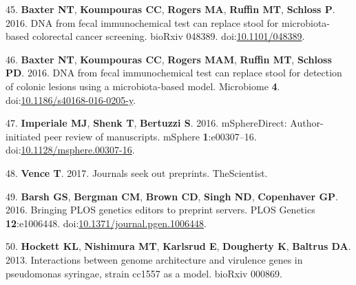 \documentclass[11pt,]{article}
\begin{document}
\hypertarget{ref-Baxter2016a}{}
45. \textbf{Baxter NT}, \textbf{Koumpouras CC}, \textbf{Rogers MA},
\textbf{Ruffin MT}, \textbf{Schloss P}. 2016. DNA from fecal
immunochemical test can replace stool for microbiota-based colorectal
cancer screening. bioRxiv 048389.
doi:\href{https://doi.org/10.1101/048389}{10.1101/048389}.

\hypertarget{ref-Baxter2016b}{}
46. \textbf{Baxter NT}, \textbf{Koumpouras CC}, \textbf{Rogers MAM},
\textbf{Ruffin MT}, \textbf{Schloss PD}. 2016. DNA from fecal
immunochemical test can replace stool for detection of colonic lesions
using a microbiota-based model. Microbiome \textbf{4}.
doi:\href{https://doi.org/10.1186/s40168-016-0205-y}{10.1186/s40168-016-0205-y}.

\hypertarget{ref-Imperiale2016}{}
47. \textbf{Imperiale MJ}, \textbf{Shenk T}, \textbf{Bertuzzi S}. 2016.
mSphereDirect: Author-initiated peer review of manuscripts. mSphere
\textbf{1}:e00307--16.
doi:\href{https://doi.org/10.1128/msphere.00307-16}{10.1128/msphere.00307-16}.

\hypertarget{ref-Vence2017}{}
48. \textbf{Vence T}. 2017. Journals seek out preprints. TheScientist.

\hypertarget{ref-Barsh2016}{}
49. \textbf{Barsh GS}, \textbf{Bergman CM}, \textbf{Brown CD},
\textbf{Singh ND}, \textbf{Copenhaver GP}. 2016. Bringing PLOS genetics
editors to preprint servers. PLOS Genetics \textbf{12}:e1006448.
doi:\href{https://doi.org/10.1371/journal.pgen.1006448}{10.1371/journal.pgen.1006448}.

\hypertarget{ref-Hockett2013}{}
50. \textbf{Hockett KL}, \textbf{Nishimura MT}, \textbf{Karlsrud E},
\textbf{Dougherty K}, \textbf{Baltrus DA}. 2013. Interactions between
genome architecture and virulence genes in pseudomonas syringae, strain
cc1557 as a model. bioRxiv 000869.
\end{document}
